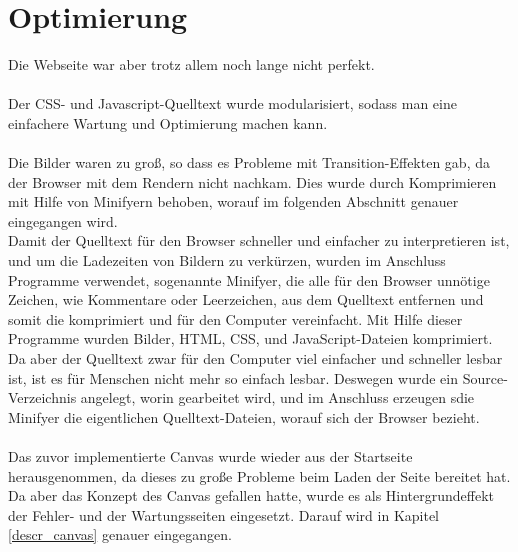 \section{Optimierung}
Die Webseite war aber trotz allem noch lange nicht perfekt. 
\\
\\
Der CSS- und Javascript-Quelltext wurde modularisiert, sodass man eine einfachere Wartung und Optimierung machen kann.
\\
\\
Die Bilder waren zu groß, so dass es Probleme mit Transition-Effekten gab, da der Browser mit dem Rendern nicht nachkam. Dies wurde durch Komprimieren mit Hilfe von Minifyern behoben, worauf im folgenden Abschnitt genauer eingegangen wird.
\\
Damit der Quelltext für den Browser schneller und einfacher zu interpretieren ist, und um die Ladezeiten von Bildern zu verkürzen, wurden im Anschluss Programme verwendet, sogenannte Minifyer, die alle für den Browser unnötige Zeichen, wie Kommentare oder Leerzeichen, aus dem Quelltext entfernen und somit die komprimiert und für den Computer vereinfacht. Mit Hilfe dieser Programme wurden Bilder, HTML, CSS, und JavaScript-Dateien komprimiert. Da aber der Quelltext zwar für den Computer viel einfacher und schneller lesbar ist, ist es für Menschen nicht mehr so einfach lesbar. Deswegen wurde ein Source-Verzeichnis angelegt, worin gearbeitet wird, und im Anschluss erzeugen sdie Minifyer die eigentlichen Quelltext-Dateien, worauf sich der Browser bezieht. 
\\
\\
Das zuvor implementierte Canvas wurde wieder aus der Startseite herausgenommen, da dieses zu große Probleme beim Laden der Seite bereitet hat. Da aber das Konzept des Canvas gefallen hatte, wurde es als Hintergrundeffekt der Fehler- und der Wartungsseiten eingesetzt. Darauf wird in Kapitel \ref{descr_canvas} genauer eingegangen.
